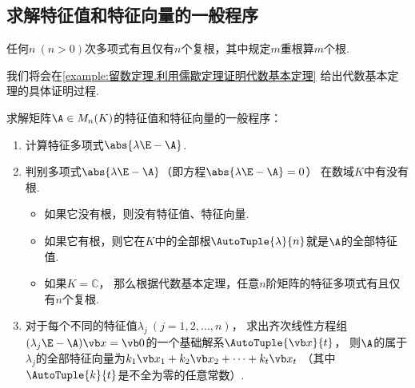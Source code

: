 \subsection{求解特征值和特征向量的一般程序}
\begin{lemma}[代数基本定理]
任何\(n\ (n>0)\)次多项式有且仅有\(n\)个复根，其中规定\(m\)重根算\(m\)个根.
\end{lemma}
我们将会在\cref{example:留数定理.利用儒歇定理证明代数基本定理} 给出代数基本定理的具体证明过程.

求解矩阵\(\A \in M_n(K)\)的特征值和特征向量的一般程序：\begin{enumerate}
	\item 计算特征多项式\(\abs{\lambda\E-\A}\).

	\item 判别多项式\(\abs{\lambda\E-\A}\)（即方程\(\abs{\lambda\E-\A}=0\)）
	在数域\(K\)中有没有根.
	\begin{itemize}
		\item 如果它没有根，则没有特征值、特征向量.
		\item 如果它有根，则它在\(K\)中的全部根\(\AutoTuple{\lambda}{n}\)就是\(\A\)的全部特征值.
		\item 如果\(K = \mathbb{C}\)，
		那么根据代数基本定理，任意\(n\)阶矩阵的特征多项式有且仅有\(n\)个复根.
	\end{itemize}

	\item 对于每个不同的特征值\(\lambda_j\ (j=1,2,\dotsc,n)\)，
	求出齐次线性方程组\((\lambda_j \E - \A)\x = \vb0\)的一个基础解系\(\AutoTuple{\x}{t}\)，
	则\(\A\)的属于\(\lambda_j\)的全部特征向量为\(k_1 \x_1 + k_2 \x_2 + \dotsb + k_t \x_t\)
	（其中\(\AutoTuple{k}{t}\)是不全为零的任意常数）.
\end{enumerate}

